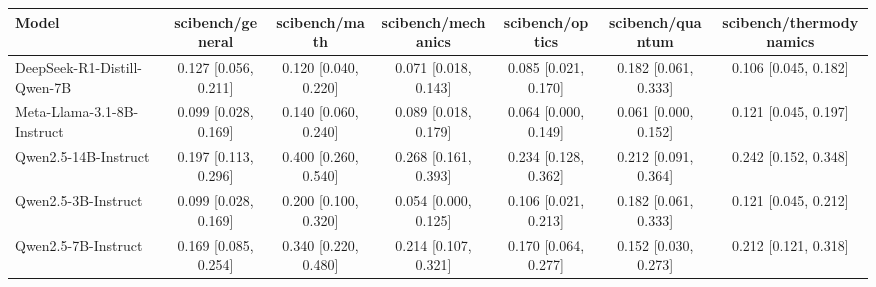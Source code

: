 \begin{tabular}{lcccccc}
Model & scibench/general & scibench/math & scibench/mechanics & scibench/optics & scibench/quantum & scibench/thermodynamics \\ \hline
DeepSeek-R1-Distill-Qwen-7B & 0.127 [0.056, 0.211] & 0.120 [0.040, 0.220] & 0.071 [0.018, 0.143] & 0.085 [0.021, 0.170] & 0.182 [0.061, 0.333] & 0.106 [0.045, 0.182] \\
Meta-Llama-3.1-8B-Instruct & 0.099 [0.028, 0.169] & 0.140 [0.060, 0.240] & 0.089 [0.018, 0.179] & 0.064 [0.000, 0.149] & 0.061 [0.000, 0.152] & 0.121 [0.045, 0.197] \\
Qwen2.5-14B-Instruct & 0.197 [0.113, 0.296] & 0.400 [0.260, 0.540] & 0.268 [0.161, 0.393] & 0.234 [0.128, 0.362] & 0.212 [0.091, 0.364] & 0.242 [0.152, 0.348] \\
Qwen2.5-3B-Instruct & 0.099 [0.028, 0.169] & 0.200 [0.100, 0.320] & 0.054 [0.000, 0.125] & 0.106 [0.021, 0.213] & 0.182 [0.061, 0.333] & 0.121 [0.045, 0.212] \\
Qwen2.5-7B-Instruct & 0.169 [0.085, 0.254] & 0.340 [0.220, 0.480] & 0.214 [0.107, 0.321] & 0.170 [0.064, 0.277] & 0.152 [0.030, 0.273] & 0.212 [0.121, 0.318] \\
\end{tabular}

